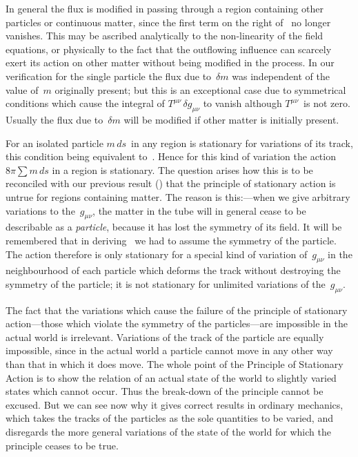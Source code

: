 \documentclass[12pt]{book}
\begin{document}
In general the flux is modified in passing through a region containing
other particles or continuous matter, since the first term on the right of~
no longer vanishes. This may be ascribed analytically to the non-linearity of
the field equations, or physically to the fact that the outflowing influence can
scarcely exert its action on other matter without being modified in the process.
In our verification for the single particle the flux due to~$\delta m$ was independent
of the value of~$m$ originally present; but this is an exceptional case due to
symmetrical conditions which cause the integral of $T^{\mu\nu}\, \delta g_{\mu\nu}$ to vanish although
$T^{\mu\nu}$~is not zero. Usually the flux due to~$\delta m$ will be modified if other matter
is initially present.

For an isolated particle $m\, ds$~in any region is stationary for variations of
its track, this condition being equivalent to~. Hence for this kind of
variation the action $8\pi \sum m\, ds$ in a region is stationary. The question arises
how this is to be reconciled with our previous result () that the principle
of stationary action is untrue for regions containing matter. The reason is
this:---when we give arbitrary variations to the~$g_{\mu\nu}$, the matter in the tube
will in general cease to be describable as a \emph{particle}, because it has lost the
symmetry of its field\footnotemark.\footnotetext
  {It will be remembered that in deriving~ we had to assume the symmetry of the particle.}
The action therefore is only stationary for a special
kind of variation of~$g_{\mu\nu}$ in the neighbourhood of each particle which deforms
the track without destroying the symmetry of the particle; it is not stationary
for unlimited variations of the~$g_{\mu\nu}$.

The fact that the variations which cause the failure of the principle of
stationary action---those which violate the symmetry of the particles---are
impossible in the actual world is irrelevant. Variations of the track of the
particle are equally impossible, since in the actual world a particle cannot
move in any other way than that in which it does move. The whole point of
the Principle of Stationary Action is to show the relation of an actual state
of the world to slightly varied states which cannot occur. Thus the break-down
of the principle cannot be excused. But we can see now why it gives
correct results in ordinary mechanics, which takes the tracks of the particles
as the sole quantities to be varied, and disregards the more general variations
of the state of the world for which the principle ceases to be true.
\end{document}

